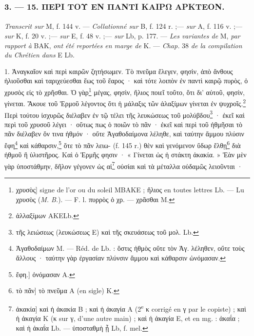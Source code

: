 \documentclass[landscape, a4paper, 11pt, oneside, polutonikogreek, french]{article}
\begin{document}
\bigskip
\centerline{\EightStarTaper}
\centerline{\EightStarTaper\EightStarTaper}
\bigskip

\subsubsection{3. --- 15. ΠΕΡΙ ΤΟΥ ΕΝ ΠΑΝΤΙ ΚΑΙΡΩ ΑΡΚΤΕΟΝ.}
\paragraph{}
\emph{Transcrit sur} M, f. 144 v. --- \emph{Collationné sur} B, f. 124 r. ;--- \emph{sur} A, f. 116 v. ;--- \emph{sur} K, f. 20 v. ;--- \emph{sur} E, f. 48 v. ;--- \emph{sur} Lb, p. 177. --- \emph{Les variantes de} M, \emph{par rapport à} BAK, \emph{ont été reportées en marge de} K. --- \emph{Chap.} 38 \emph{de la compilation du Chrétien dans} E Lb.

\bigskip

1. Ἀναγκαῖον καὶ περὶ καιρῶν ζητήσωμεν. Τὸ πνεῦμα ἔλεγεν, φησὶν, ἀπὸ ἄνθους ἡλιοῦσθαι καὶ ταριχεύεσθαι ἕως τοῦ ἔαρος · καὶ τότε λοιπὸν ἐν παντὶ καιρῷ πυρὸς, ὁ χρυσὸς εἰς τὸ χρῆσθαι. Ὁ γὰρ\footnote{χρυσὸς] signe de l'or ou du soleil MBAKE ; ἥλιος en toutes lettres Lb. --- Lu χρυσὸς (\emph{M. B.}). --- F. l. πυρρὸς ὁ χρ. --- χρᾶσθαι M.} μέγας, φησὶν, ἥλιος ποιεῖ τοῦτο, ὅτι δι' αὐτοῦ, φησὶν, γίνεται. Ἄκουε τοῦ Ἑρμοῦ λέγοντος ὅτι ἡ μάλαξις τῶν ἀλαξίμων γίνεται ἐν ψυχροῖς.\footnote{ἀλλαξίμων AKELb.} Περὶ τούτου ἰσχυρῶς διέλαβεν ἐν τῷ τέλει τῆς λευκώσεως τοῦ μολύβδου\footnote{τῆς λειώσεως (λευκώσεως E) καὶ τῆς σκευάσεως τοῦ μολ. Lb.} · ἐκεῖ καὶ περὶ τοῦ χρυσοῦ λέγει · οὕτως πως ὁ ποιῶν τὸ πᾶν · ἐκεῖ καὶ περὶ τοῦ ἠθμῆσαι τὸ πᾶν διέλαβεν ὅν τινα ἠθμόν · οὔτε Ἀγαθοδαίμονα λέληθε, καὶ ταύτην ἄμμου πλύσιν ἔφη\footnote{Ἀγαθοδαίμων M. --- Réd. de Lb. : ὅστις ἡθμὸς οὔτε τὸν Ἀγ. λέληθεν, οὔτε τοὺς ἄλλους · ταύτην γὰρ ἐργασίαν πλύνσιν ἄμμου καὶ κάθαρσιν ὠνόμασαν.} καὶ κάθαρσιν,\footnote{ἔφη.] ὀνόμασαν A.} ὅτε τὸ πᾶν λειω- (f. 145 r.) θὲν καὶ γενόμενον ὕδωρ ἔλθῃ\footnote{τὸ πᾶν] τὸ πνεῦμα A (en sigle) K.} διὰ ἠθμοῦ ἢ ὑλιστῆρος. Καὶ ὁ Ἑρμῆς φησιν · « Γίνεται ὡς ἡ στάκτη ἀκακία. » Ἐὰν μὲν γὰρ ὑποστάθμην, δῆλον γέγονεν ὡς αἱ\footnote{ἀκακία] καὶ ἡ ἀκακία B ; καὶ ἡ ἀκαγία A (2\textsuperscript{e} κ corrigé en γ par le copiste) ; καὶ ἡ ἀκαγία K (κ sur γ, d'une autre main) ; καὶ ἡ ἀκαγία E, et en mg. : ἀκαΐα ; καὶ ἡ ἀκαΐα Lb. --- ὑποσταθμὴ ᾖ Lb, f. mel.} οὐσίαι καὶ τὰ μέταλλα οὐδαμῶς λειοῦνται ·
\end{document}
